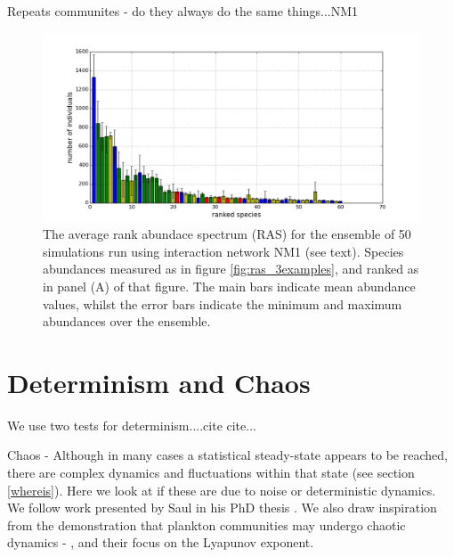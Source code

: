 Repeats communites - do they always do the same things...NM1

\begin{figure}[h!]
	\centering
	\includegraphics[width=1.0\linewidth]{"./chapters/chapter04b/figures/ras_dist"}
    \caption{The average rank abundace spectrum (RAS) for the ensemble of 50 simulations run using interaction network NM1 (see text). Species abundances measured as in figure \ref{fig:ras_3examples}, and ranked as in panel (A) of that figure. The main bars indicate mean abundance values, whilst the error bars indicate the minimum and maximum abundances over the ensemble.}    
    \label{fig:ras_dist}
\end{figure}


\section{Determinism and Chaos}
\label{sec:determinism}

We use two tests for determinism....cite cite...

Chaos - Although in many cases a statistical steady-state appears to be reached, there are complex dynamics and fluctuations within that state (see section \ref{whereis}).  Here we look at if these are due to noise or deterministic dynamics. We follow work presented by Saul in his PhD thesis \cite{saul09phd}. We also draw inspiration from the demonstration that plankton communities may undergo chaotic dynamics - \cite{beninca2008chaos}, and their focus on the Lyapunov exponent.



